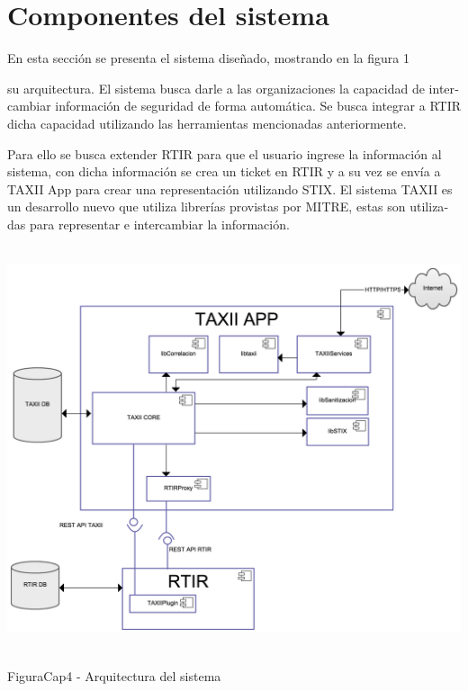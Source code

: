 	\section[Componentes del sistema]{\foreignlanguage{spanish}{Componentes del sistema}}
	
	\bigskip
	
	\foreignlanguage{spanish}{En esta sección se presenta el sistema diseñado, mostrando en la figura 1 }
	
	\foreignlanguage{spanish}{su arquitectura. El sistema busca darle a las organizaciones la capacidad de intercambiar
		información de seguridad de forma automática. Se busca integrar a RTIR dicha capacidad utilizando las herramientas
		mencionadas anteriormente. }
	
	\foreignlanguage{spanish}{Para ello se busca extender RTIR para que el usuario ingrese la información al sistema, con
		dicha información se crea un ticket en RTIR y a su vez se envía a TAXII App para crear una representación utilizando
		STIX. El sistema TAXII es un desarrollo nuevo que utiliza librerías provistas por MITRE, estas son utilizadas para
		representar e intercambiar la información.}
	
	
	\bigskip
	
	\includegraphics[width=5.7638in,height=4.6846in]{Diseno21-img/Diseno21-img003.png} 
	
	{\centering
		\foreignlanguage{spanish}{FiguraCap4 }\foreignlanguage{spanish}{ - Arquitectura del sistema}
		\par}
	
